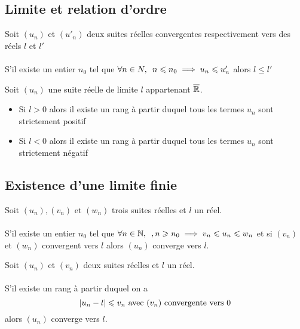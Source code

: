 \subsection{Limite et relation d'ordre}
\begin{defprop}
    Soit \((u_n)\) et \((u'_n)\) deux suites réelles convergentes respectivement vers des réels \(l\) et \(l'\)\\~\\
    S'il existe un entier \(n_0\) tel que \(\quantifs{\forall n \in N} n \leq n_0 \imp u_n \leq u'_n\) alors \(l \leq l'\)
\end{defprop}
\begin{defprop}
    Soit \((u_n)\) une suite réelle de limite \(l\) appartenant \(\overline{\mathbb{R}}\).
    \begin{itemize}
        \item Si \(l>0\) alors il existe un rang à partir duquel tous les termes \(u_n\) sont strictement positif
        \item  Si \(l<0\) alors il existe un rang à partir duquel tous les termes \(u_n\) sont strictement négatif
    \end{itemize}
\end{defprop}

\subsection{Existence d'une limite finie}

\begin{theo}
    Soit \((u_n),(v_n)\) et \((w_n)\) trois suites réelles et \(l\) un réel. \\~\\
    S'il existe un entier \(n_0\) tel que  \(\quantifs{\forall n \in \N}, n\geq n_0 \imp v_n \leq u_n \leq w_n\) et si \((v_n)\) et \((w_n)\) convergent vers \(l\) alors \((u_n)\) converge vers \(l\).
\end{theo}

\begin{prop}[pratique]
    Soit \((u_n)\) et \((v_n)\) deux suites réelles et \(l\) un réel. \\~\\
    S'il existe un rang à partir duquel on a 
    \[\left\lvert u_n -l\right\rvert \leqslant v_n \text{ avec } (v_n) \text{ convergente vers } 0\]
    alors \((u_n)\) converge vers \(l\).
\end{prop}


